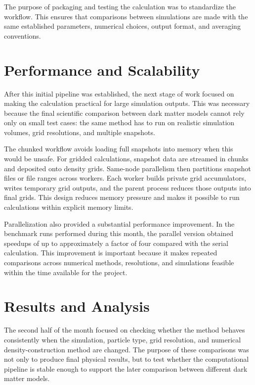 \documentclass[
    aps,
    prd,
    preprint,
    onecolumn,
    nofootinbib,
    groupedaddress
]{revtex4-2}
\begin{document}
The purpose of packaging and testing the calculation was to standardize the workflow. This ensures that comparisons between simulations are made with the same established parameters, numerical choices, output format, and averaging conventions.

\section{Performance and Scalability}

After this initial pipeline was established, the next stage of work focused on making the calculation practical for large simulation outputs. This was necessary because the final scientific comparison between dark matter models cannot rely only on small test cases: the same method has to run on realistic simulation volumes, grid resolutions, and multiple snapshots.

The chunked workflow avoids loading full snapshots into memory when this would be unsafe. For gridded calculations, snapshot data are streamed in chunks and deposited onto density grids. Same-node parallelism then partitions snapshot files or file ranges across workers. Each worker builds private grid accumulators, writes temporary grid outputs, and the parent process reduces those outputs into final grids. This design reduces memory pressure and makes it possible to run calculations within explicit memory limits.

Parallelization also provided a substantial performance improvement. In the benchmark runs performed during this month, the parallel version obtained speedups of up to approximately a factor of four compared with the serial calculation. This improvement is important because it makes repeated comparisons across numerical methods, resolutions, and simulations feasible within the time available for the project.

\section{Results and Analysis}

The second half of the month focused on checking whether the method behaves consistently when the simulation, particle type, grid resolution, and numerical density-construction method are changed. The purpose of these comparisons was not only to produce final physical results, but to test whether the computational pipeline is stable enough to support the later comparison between different dark matter models.
\end{document}
